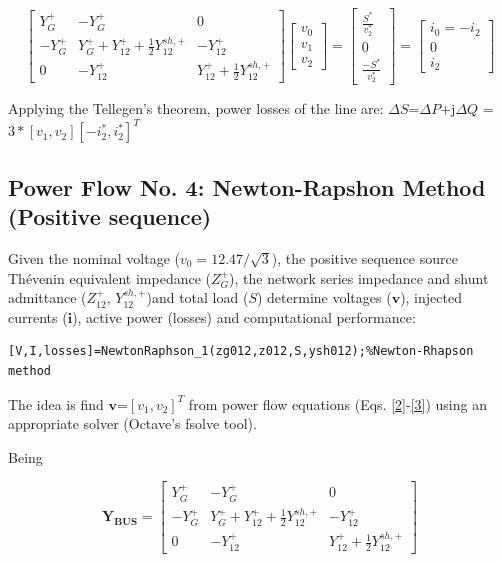 \documentclass[12pt]{article}
\begin{document}
\begin{equation}
 \left[ \begin{array}{ccc}\label{1}
 {Y}^{+}_{G} & - {Y}^{+}_{G}  &0 \\
 - {Y}^{+}_{G} &  {Y}^{+}_{G}+{Y}^{+}_{12}+\frac{1}{2}{Y}^{sh,+}_{12} & -{Y}^{+}_{12}\\
 0 & -{Y}^{+}_{12} & {Y}^{+}_{12}+\frac{1}{2}{Y}^{sh,+}_{12}
             \end{array}
           \right]
  \begin{bmatrix}
  {v}_0\\
	{v}_1\\
	{v}_2
\end{bmatrix}
  =
     \begin{bmatrix}
   \frac{{S}^*}{{v}^*_2} \\
  0\\
  \frac{-{S}^*}{{v}^*_2}
  \end{bmatrix}=
  \begin{bmatrix}
{i}_0=-{i}_2\\
0\\
{i}_2
\end{bmatrix}
  \end{equation}


Applying the Tellegen's theorem, power losses of the line are: $\Delta {S}$=$\Delta P$+j$\Delta Q$
=$3*[{v}_1,{v}_2][-{i}^*_2,{i}^*_2]^T$

\subsection{Power Flow No. 4: Newton-Rapshon Method (Positive sequence)}

Given the nominal voltage ($v_0=12.47/\sqrt{3}$), the positive sequence source Th\'evenin equivalent impedance (${Z}^{+}_{G}$), the network series impedance and shunt admittance (${Z}^{+}_{12}$, ${Y}^{sh,+}_{12}$)and total load (${S}$)
determine voltages ($\bm{v}$), injected currents ($\mathbf{i}$), active power (losses) and computational performance:

\begin{verbatim}
[V,I,losses]=NewtonRaphson_1(zg012,z012,S,ysh012);%Newton-Rhapson method
\end{verbatim}

The idea is find $\bm{v}$=$[{v}_1,{v}_2]^T$ from power flow equations (Eqs. \ref{2}-\ref{3}) using an appropriate solver (Octave's {fsolve} tool).

Being


\begin{equation}\mathbf{Y_{BUS}}=
  \left[ \begin{array}{ccc}\label{1}
 {Y}^{+}_{G} & - {Y}^{+}_{G}  &0 \\
 - {Y}^{+}_{G} &  {Y}^{+}_{G}+{Y}^{+}_{12}+\frac{1}{2}{Y}^{sh,+}_{12} & -{Y}^{+}_{12}\\
 0 & -{Y}^{+}_{12} & {Y}^{+}_{12}+\frac{1}{2}{Y}^{sh,+}_{12}
             \end{array}           \right]
 \end{equation}
\end{document}
